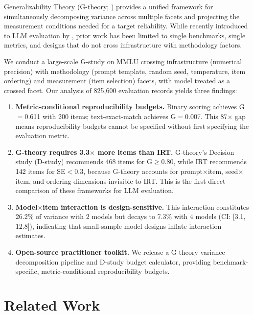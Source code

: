 \documentclass[letterpaper]{article}
\begin{document}
Generalizability Theory (G-theory; \citealp{shavelson1991generalizability,brennan2001generalizability}) provides a unified framework for simultaneously decomposing variance across multiple facets and projecting the measurement conditions needed for a target reliability. While recently introduced to LLM evaluation by \citet{mesting2026generalizability}, prior work has been limited to single benchmarks, single metrics, and designs that do not cross infrastructure with methodology factors.

We conduct a large-scale G-study on MMLU crossing infrastructure (numerical precision) with methodology (prompt template, random seed, temperature, item ordering) and measurement (item selection) facets, with model treated as a crossed facet. Our analysis of 825,600 evaluation records yields three findings:

\begin{enumerate}[leftmargin=*,topsep=2pt,itemsep=1pt]
    \item \textbf{Metric-conditional reproducibility budgets.} Binary scoring achieves G$=$0.611 with 200 items; text-exact-match achieves G$=$0.007. This 87$\times$ gap means reproducibility budgets cannot be specified without first specifying the evaluation metric.
    \item \textbf{G-theory requires 3.3$\times$ more items than IRT.} G-theory's Decision study (D-study) recommends 468 items for G$\geq$0.80, while IRT recommends 142 items for SE$<$0.3, because G-theory accounts for prompt$\times$item, seed$\times$item, and ordering dimensions invisible to IRT. This is the first direct comparison of these frameworks for LLM evaluation.
    \item \textbf{Model$\times$item interaction is design-sensitive.} This interaction constitutes 26.2\% of variance with 2 models but decays to 7.3\% with 4 models (CI: [3.1, 12.8]), indicating that small-sample model designs inflate interaction estimates.
    \item \textbf{Open-source practitioner toolkit.} We release a G-theory variance decomposition pipeline and D-study budget calculator, providing benchmark-specific, metric-conditional reproducibility budgets.
\end{enumerate}

\section{Related Work}
\end{document}
